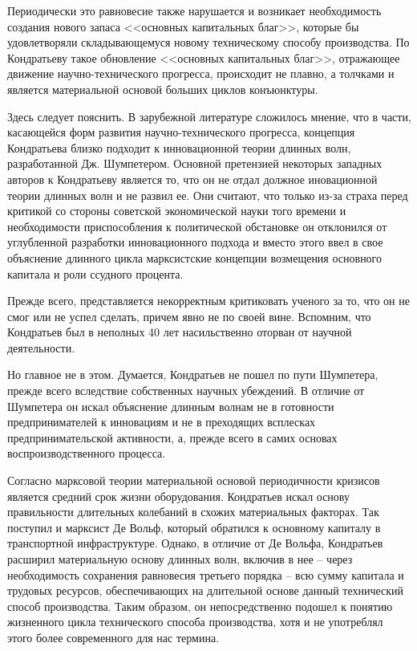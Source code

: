\documentclass[a4paper,14pt]{extarticle}
\begin{document}
 	Периодически это равновесие также нарушается и возникает необходимость создания нового запаса <<основных капитальных благ>>, которые бы удовлетворяли складывающемуся новому техническому способу производства. По Кондратьеву такое обновление <<основных капитальных благ>>, отражающее движение научно-технического прогресса, происходит не плавно, а толчками и является материальной основой больших циклов конъюнктуры.
 	
 	Здесь следует пояснить. В зарубежной литературе сложилось мнение, что в части, касающейся форм развития научно-технического прогресса, концепция Кондратьева близко подходит к инновационной теории длинных волн, разработанной Дж. Шумпетером. Основной претензией некоторых западных авторов к Кондратьеву является то, что он не отдал должное иновационной теории длинных волн и не развил ее. Они считают, что только из-за страха перед критикой со стороны советской экономической науки того времени и необходимости приспособления к политической обстановке он отклонился от углубленной разработки инновационного подхода и вместо этого ввел в свое объяснение длинного цикла марксистские концепции возмещения основного капитала и роли ссудного процента.
 	
 	Прежде всего, представляется некорректным критиковать ученого за то, что он не смог или не успел сделать, причем явно не по своей вине. Вспомним, что Кондратьев был в неполных 40 лет насильственно оторван от научной деятельности.
 	
 	Но главное не в этом. Думается, Кондратьев не пошел по пути Шумпетера, прежде всего вследствие собственных научных убеждений. В отличие от Шумпетера он искал объяснение длинным волнам не в готовности предпринимателей к инновациям и не в преходящих всплесках предпринимательской активности, а, прежде всего в самих основах воспроизводственного процесса.
 	
 	Согласно марксовой теории материальной основой периодичности кризисов является средний срок жизни оборудования. Кондратьев искал основу правильности длительных колебаний в схожих материальных факторах. Так поступил и марксист Де Вольф, который обратился к основному капиталу в транспортной инфраструктуре. Однако, в отличие от Де Вольфа, Кондратьев расширил материальную основу длинных волн, включив в нее – через необходимость сохранения равновесия третьего порядка – всю сумму капитала и трудовых ресурсов, обеспечивающих на длительной основе данный технический способ производства. Таким образом, он непосредственно подошел к понятию жизненного цикла технического способа производства, хотя и не употреблял этого более современного для нас термина.
 	
\end{document}
